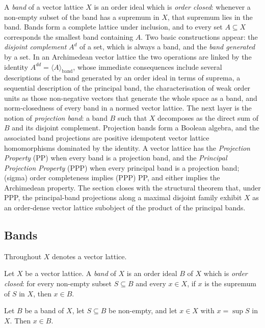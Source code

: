 A \emph{band} of a vector lattice $X$ is an order ideal which is
\emph{order closed}: whenever a non-empty subset of the band has a
supremum in $X$, that supremum lies in the band. Bands form a complete
lattice under inclusion, and to every set $A \subseteq X$ corresponds
the smallest band containing $A$. Two basic constructions appear: the
\emph{disjoint complement} $A^d$ of a set, which is always a band, and
the \emph{band generated} by a set. In an Archimedean vector lattice the
two operations are linked by the identity $A^{dd} = \langle A
\rangle_{\mathrm{band}}$, whose immediate consequences include several
descriptions of the band generated by an order ideal in terms of
suprema, a sequential description of the principal band, the
characterisation of weak order units as those non-negative vectors that
generate the whole space as a band, and norm-closedness of every band
in a normed vector lattice. The next layer is the notion of
\emph{projection band}: a band $B$ such that $X$ decomposes as the
direct sum of $B$ and its disjoint complement. Projection bands form a
Boolean algebra, and the associated band projections are positive
idempotent vector lattice homomorphisms dominated by the identity. A
vector lattice has the \emph{Projection Property} (PP) when every band
is a projection band, and the \emph{Principal Projection Property}
(PPP) when every principal band is a projection band; (sigma) order
completeness implies (PPP) PP, and either implies the Archimedean
property. The section closes with the structural theorem that, under
PPP, the principal-band projections along a maximal disjoint family
exhibit $X$ as an order-dense vector lattice subobject of the product
of the principal bands.

\subsection{Bands}

Throughout $X$ denotes a vector lattice.

\begin{definition}
\label{def:band}
\leanok
{}
Let $X$ be a vector lattice. A \emph{band} of $X$ is an order ideal
$B$ of $X$ which is \emph{order closed}: for every non-empty subset
$S \subseteq B$ and every $x \in X$, if $x$ is the supremum of $S$ in
$X$, then $x \in B$.
\end{definition}

\begin{lemma}
\label{lem:band-sSup-mem}
\leanok
{}
Let $B$ be a band of $X$, let $S \subseteq B$ be non-empty, and let
$x \in X$ with $x = \sup S$ in $X$. Then $x \in B$.
\end{lemma}

